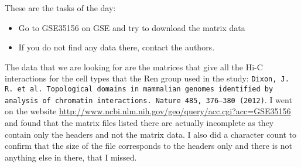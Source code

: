 \documentclass[idxtotoc,hyperref,openany]{labbook} %
\begin{document}











These are the tasks of the day:

\begin{itemize}
\item Go to GSE35156 on GSE and try to download the matrix
      data
\item If you do not find any data there, contact the authors.
\end{itemize}

The data that we are looking for are the matrices that give all the 
Hi-C interactions for the cell types that the Ren group used in the study:
\texttt{Dixon, J. R. et al. Topological domains in mammalian genomes identified by analysis of chromatin interactions. Nature 485, 376–380 (2012)}.
I went on the website \url{http://www.ncbi.nlm.nih.gov/geo/query/acc.cgi?acc=GSE35156} and found that the matrix files listed there are actually
incomplete as they contain only the headers and not the matrix data. I also
did a character count to confirm that the size of the file corresponds
to the headers only and there is not anything else in there, that I missed.
\end{document}
